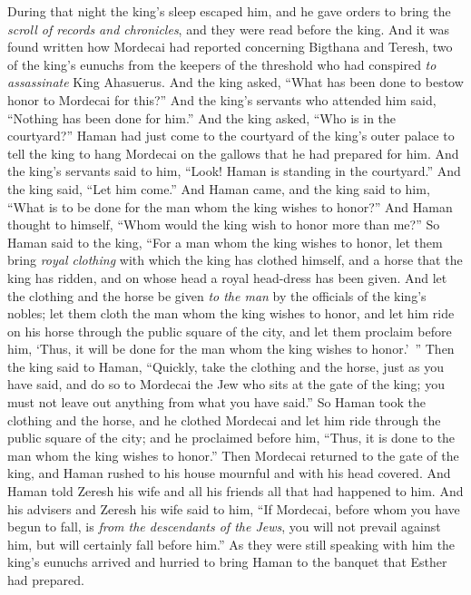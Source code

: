 \begin{biblechapter} %
 During that night the king’s sleep escaped him, and he gave orders to bring the \textit{scroll of records and chronicles}, and they were read before the king.
\verse And it was found written how Mordecai had reported concerning Bigthana and Teresh, two of the king’s eunuchs from the keepers of the threshold who had conspired \textit{to assassinate} King Ahasuerus.
\verse And the king asked, “What has been done to bestow honor to Mordecai for this?” And the king’s servants who attended him said, “Nothing has been done for him.”
\verse And the king asked, “Who is in the courtyard?” Haman had just come to the courtyard of the king’s outer palace to tell the king to hang Mordecai on the gallows that he had prepared for him.
\verse And the king’s servants said to him, “Look! Haman is standing in the courtyard.” And the king said, “Let him come.”
\verse And Haman came, and the king said to him, “What is to be done for the man whom the king wishes to honor?” And Haman thought to himself, “Whom would the king wish to honor more than me?”
\verse So Haman said to the king, “For a man whom the king wishes to honor,
\verse let them bring \textit{royal clothing} with which the king has clothed himself, and a horse that the king has ridden, and on whose head a royal head-dress has been given.
\verse And let the clothing and the horse be given \textit{to the man} by the officials of the king’s nobles; let them cloth the man whom the king wishes to honor, and let him ride on his horse through the public square of the city, and let them proclaim before him, ‘Thus, it will be done for the man whom the king wishes to honor.’ ”
\verse Then the king said to Haman, “Quickly, take the clothing and the horse, just as you have said, and do so to Mordecai the Jew who sits at the gate of the king; you must not leave out anything from what you have said.”
\verse So Haman took the clothing and the horse, and he clothed Mordecai and let him ride through the public square of the city; and he proclaimed before him, “Thus, it is done to the man whom the king wishes to honor.”
\verse Then Mordecai returned to the gate of the king, and Haman rushed to his house mournful and with his head covered.
\verse And Haman told Zeresh his wife and all his friends all that had happened to him. And his advisers and Zeresh his wife said to him, “If Mordecai, before whom you have begun to fall, is \textit{from the descendants of the Jews}, you will not prevail against him, but will certainly fall before him.”
\verse As they were still speaking with him the king’s eunuchs arrived and hurried to bring Haman to the banquet that Esther had prepared.
\end{biblechapter}

